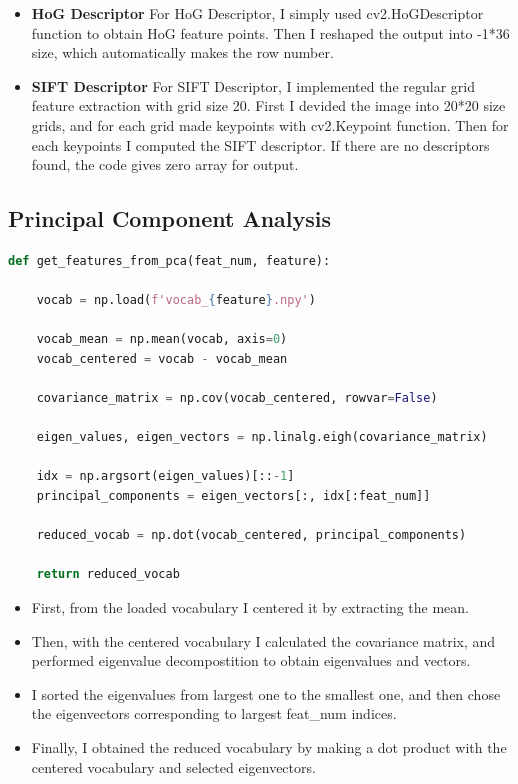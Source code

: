 \begin{itemize}
    \item \textbf{HoG Descriptor} For HoG Descriptor, I simply used cv2.HoGDescriptor function to obtain HoG feature points. Then I reshaped the output into -1*36 size, which automatically makes the row number.
    \item \textbf{SIFT Descriptor} For SIFT Descriptor, I implemented the regular grid feature extraction with grid size 20. First I devided the image into 20*20 size grids, and for each grid made keypoints with cv2.Keypoint function. Then for each keypoints I computed the SIFT descriptor. If there are no descriptors found, the code gives zero array for output.
\end{itemize}
\subsection*{Principal Component Analysis}
\begin{lstlisting}[language=python]
def get_features_from_pca(feat_num, feature):

    vocab = np.load(f'vocab_{feature}.npy')
    
    vocab_mean = np.mean(vocab, axis=0)
    vocab_centered = vocab - vocab_mean

    covariance_matrix = np.cov(vocab_centered, rowvar=False)

    eigen_values, eigen_vectors = np.linalg.eigh(covariance_matrix)

    idx = np.argsort(eigen_values)[::-1]
    principal_components = eigen_vectors[:, idx[:feat_num]]

    reduced_vocab = np.dot(vocab_centered, principal_components)

    return reduced_vocab
\end{lstlisting}
\begin{itemize}
    \item First, from the loaded vocabulary I centered it by extracting the mean.
    \item Then, with the centered vocabulary I calculated the covariance matrix, and performed eigenvalue decompostition to obtain eigenvalues and vectors.
    \item I sorted the eigenvalues from largest one to the smallest one, and then chose the eigenvectors corresponding to largest feat\_num indices. 
    \item Finally, I obtained the reduced vocabulary by making a dot product with the centered vocabulary and selected eigenvectors.
\end{itemize}

